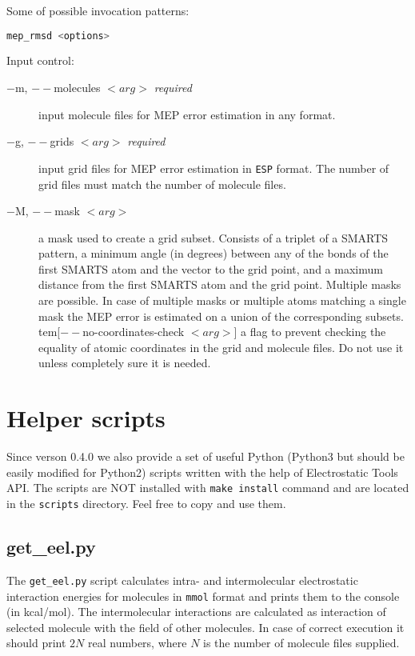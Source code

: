 \documentclass[10pt,a4paper]{article}
\begin{document}
Some of possible invocation patterns:
\begin{lstlisting}[language=bash]
mep_rmsd <options>
\end{lstlisting}

Input control:
\begin{description}
\item[$-$m, $--$molecules $<arg>$ \textit{required}] input molecule files for MEP error 
estimation in any format. 
\item[$-$g, $--$grids $<arg>$ \textit{required}] input grid files for MEP error 
estimation in \lstinline{ESP} format. The number of grid files must match the number 
of molecule files. 
\item[$-$M, $--$mask $<arg>$] a mask used to create a grid subset. Consists of a 
triplet of a SMARTS pattern, a minimum angle (in degrees) between any of the bonds 
of the first SMARTS atom and the vector to the grid point, and 
a maximum distance from the first SMARTS atom and the grid point. Multiple masks
are possible. In case of multiple masks or multiple atoms matching a single mask 
the MEP error is estimated on a union of the corresponding subsets.
tem[$--$no-coordinates-check $<arg>$] a flag to prevent checking the equality of 
atomic coordinates in the grid and molecule files. Do not use it unless  
completely sure it is needed.
\end{description}

\newpage
\section{Helper scripts}
Since verson 0.4.0 we also provide a set of useful Python 
(Python3 but should be easily modified for Python2) scripts written with the help
of Electrostatic Tools API. The scripts are NOT installed with \lstinline{make install}
command and are located in the \lstinline{scripts} directory. 
Feel free to copy and use them.

\subsection{get\_eel.py}
The \lstinline{get_eel.py} script calculates intra- and intermolecular electrostatic 
interaction energies for molecules in \lstinline{mmol} format and prints them 
to the console (in kcal/mol). The intermolecular interactions are calculated as 
interaction of selected molecule with the field of other molecules. In case of correct 
execution it should print $2N$ real numbers, where $N$ is the number of molecule 
files supplied.
\end{document}

